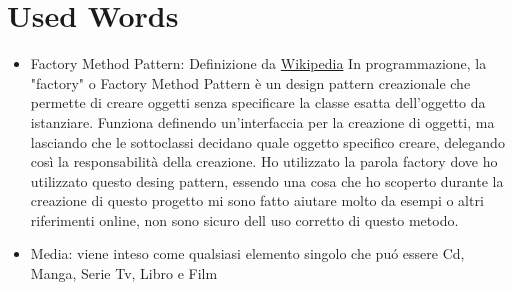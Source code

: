 \documentclass[a4paper,12pt]{article}
\begin{document}
\section{Used Words}
\begin{itemize}
    \item Factory Method Pattern: Definizione da \href{https://it.wikipedia.org/wiki/Factory_method}{Wikipedia}  In programmazione, la "factory" o Factory Method Pattern è un design pattern creazionale che permette di creare oggetti senza specificare la classe esatta dell'oggetto da istanziare. Funziona definendo un'interfaccia per la creazione di oggetti, ma lasciando che le sottoclassi decidano quale oggetto specifico creare, delegando così la responsabilità della creazione. Ho utilizzato la parola factory dove ho utilizzato questo desing pattern, essendo una cosa che ho scoperto durante la creazione di questo progetto mi sono fatto aiutare molto da esempi o altri riferimenti online, non sono sicuro dell uso corretto di questo metodo.
    \item Media: viene inteso come qualsiasi elemento singolo che puó essere Cd, Manga, Serie Tv, Libro e Film
\end{itemize}
\end{document}
